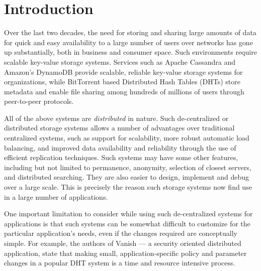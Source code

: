 \documentclass[11pt,a4paper]{article}
\title{\vspace{5em}{\Huge Chord and DHT}}
\date{\vspace{-8em}{\Large 15 pages}} %
\author{\vspace{5em}\\\textbf{\Large Liu Linlin}\\A0078051J \and \vspace{5em}\\\textbf{\Large Vipul Sharma}\\A0178385M \and \vspace{5em}\\\textbf{\Large Anshul Aggarwal}\\A0191501R}
\begin{document}
    
    \maketitle
    \newpage
    
    \begin{abstract}
        We discuss the development of distributed storage systems, primarily focusing on Distributed Hash Tables (DHTs), which are used for lookup in such systems. Designing such a large scale system can be quite hard, and we describe some design techniques and goals, their pros and cons, and the optimal scenarios for these design choices. We also look at the evolution of such systems over the past couple of decades, their advantages and limitations, and some promising future directions for the field as a whole.
    \end{abstract}
    
    \section{Introduction}
    
    Over the last two decades, the need for storing and sharing large amounts of data for quick and easy availability to a large number of users over networks has gone up substantially, both in business and consumer space. Such environments require scalable key-value storage systems. Services such as Apache Cassandra \cite{Cassandra} and Amazon's DynamoDB\cite{DynamoDB} provide scalable, reliable key-value storage systems for organizations, while BitTorrent based Distributed Hash Tables (DHTs) store metadata and enable file sharing among hundreds of millions of users through peer-to-peer protocols.
    
    All of the above systems are \textit{distributed} in nature. Such de-centralized or distributed storage systems allows a number of advantages over traditional centralized systems, such as support for scalability, more robust automatic load balancing, and improved data availability and reliability through the use of efficient replication techniques. Such systems may have some other features, including but not limited to permanence, anonymity, selection of closest servers, and distributed searching. They are also easier to design, implement and debug over a large scale. This is precisely the reason such storage systems now find use in a large number of applications.
    
    One important limitation to consider while using such de-centralized systems for applications is that such systems can be somewhat difficult to customize for the particular application's needs, even if the changes required are conceptually simple. For example, the authors of Vanish \cite{geambasu2009vanish} --- a security oriented distributed application, state that making small, application-specific policy and parameter changes in a popular DHT system is a time and resource intensive process.
    
\end{document}
